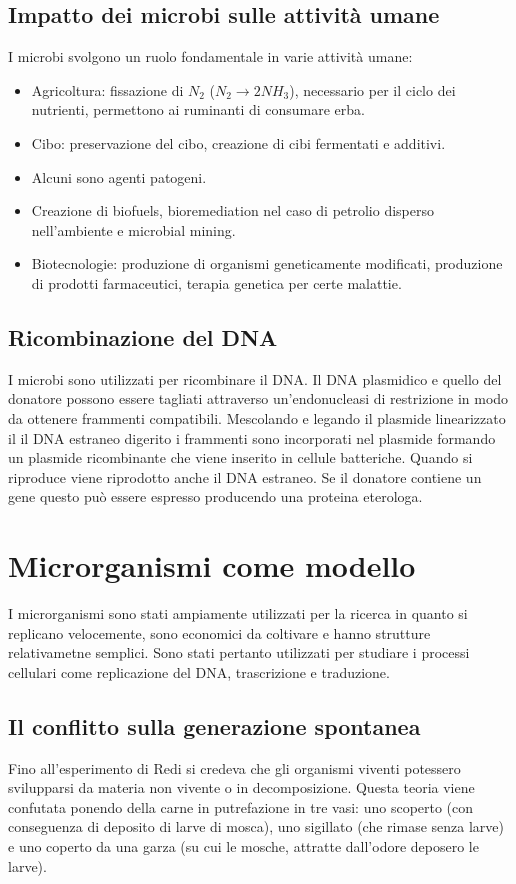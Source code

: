 \subsection{Impatto dei microbi sulle attivit\`a umane}
I microbi svolgono un ruolo fondamentale in varie attivit\`a umane:
\begin{itemize}
\item Agricoltura: fissazione di $N_2$ ($N_2\rightarrow 2NH_3$), necessario per il ciclo dei nutrienti, permettono ai ruminanti di consumare erba.
\item Cibo: preservazione del cibo, creazione di cibi fermentati e additivi.
\item Alcuni sono agenti patogeni.
\item Creazione di biofuels, bioremediation nel caso di petrolio disperso nell'ambiente e microbial mining.
\item Biotecnologie: produzione di organismi geneticamente modificati, produzione di prodotti farmaceutici, terapia genetica per certe malattie. 
\end{itemize}
\subsection{Ricombinazione del DNA}
I microbi sono utilizzati per ricombinare il DNA. Il DNA plasmidico e quello del donatore possono essere tagliati attraverso un'endonucleasi di restrizione
in modo da ottenere frammenti compatibili. Mescolando e legando il plasmide linearizzato il il DNA estraneo digerito i frammenti sono incorporati nel 
plasmide formando un plasmide ricombinante che viene inserito in cellule batteriche. Quando si riproduce viene riprodotto anche il DNA estraneo. Se il 
donatore contiene un gene questo pu\`o essere espresso producendo una proteina eterologa. 
\section{Microrganismi come modello}
I microrganismi sono stati ampiamente utilizzati per la ricerca in quanto si replicano velocemente, sono economici da coltivare e hanno strutture 
relativametne semplici. Sono stati pertanto utilizzati per studiare i processi cellulari come replicazione del DNA, trascrizione e traduzione. 
\subsection{Il conflitto sulla generazione spontanea}
Fino all'esperimento di Redi si credeva che gli organismi viventi potessero svilupparsi da materia non vivente o in decomposizione. Questa teoria viene
confutata ponendo della carne in putrefazione in tre vasi: uno scoperto (con conseguenza di deposito di larve di mosca), uno sigillato (che rimase senza 
larve) e uno coperto da una garza (su cui le mosche, attratte dall'odore deposero le larve).
